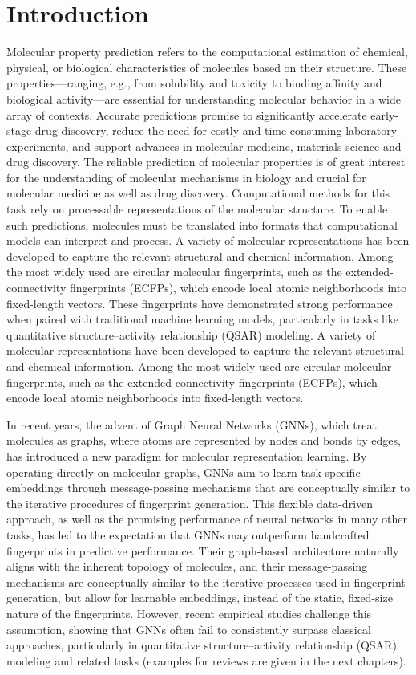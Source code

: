 \chapter{Introduction}

Molecular property prediction refers to the computational estimation of chemical, physical, or biological characteristics of molecules based on their structure. These properties—ranging, e.g., from solubility and toxicity to binding affinity and biological activity—are essential for understanding molecular behavior in a wide array of contexts. Accurate predictions promise to significantly accelerate early-stage drug discovery, reduce the need for costly and time-consuming laboratory experiments, and support advances in molecular medicine, materials science and drug discovery.
The reliable prediction of molecular properties is of great interest for the understanding of molecular mechanisms in biology and crucial for molecular medicine as well as drug discovery. Computational  methods for this task rely on processable representations of the molecular structure.
To enable such predictions, molecules must be translated into formats that computational models can interpret and process. A variety of molecular representations has been developed to capture the relevant structural and chemical information. Among the most widely used are circular molecular fingerprints, such as the extended-connectivity fingerprints (ECFPs), which encode local atomic neighborhoods into fixed-length vectors. These fingerprints have demonstrated strong performance when paired with traditional machine learning models, particularly in tasks like quantitative structure–activity relationship (QSAR) modeling.
A variety of molecular representations have been developed to capture the relevant structural and chemical information. Among the most widely used are circular molecular fingerprints, such as the extended-connectivity fingerprints (ECFPs), which encode local atomic neighborhoods into fixed-length vectors. 

In recent years, the advent of Graph Neural Networks (GNNs), which treat molecules as graphs, where atoms are represented by nodes and bonds by edges, has introduced a new paradigm for molecular representation learning.  By operating directly on molecular graphs, GNNs aim to learn task-specific embeddings through message-passing mechanisms that are conceptually similar to the iterative procedures of fingerprint generation. 
This flexible data-driven approach, as well as the promising performance of neural networks in many other tasks, has led to the expectation that GNNs may outperform handcrafted fingerprints in predictive performance. Their graph-based architecture naturally aligns with the inherent topology of molecules, and their message-passing mechanisms are conceptually similar to the iterative processes used in fingerprint generation, but allow for learnable embeddings, instead of the static, fixed-size nature of the fingerprints.
However, recent empirical studies challenge this assumption, showing that GNNs often fail to consistently surpass classical approaches, particularly in quantitative structure–activity relationship (QSAR) modeling and related tasks (examples for reviews are given in the next chapters).

